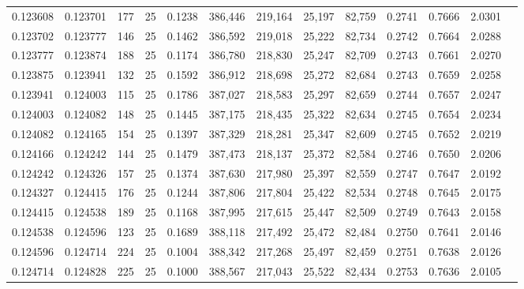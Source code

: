 \begin{tabular}{rrrrrrrrrrrrr}
0.123608 & 0.123701 &   177 &  25 &                                     0.1238 & 386,446 & 219,164 &  25,197 &  82,759 & 0.2741 & 0.7666 & 2.0301 \\
0.123702 & 0.123777 &   146 &  25 &                                     0.1462 & 386,592 & 219,018 &  25,222 &  82,734 & 0.2742 & 0.7664 & 2.0288 \\
0.123777 & 0.123874 &   188 &  25 &                                     0.1174 & 386,780 & 218,830 &  25,247 &  82,709 & 0.2743 & 0.7661 & 2.0270 \\
0.123875 & 0.123941 &   132 &  25 &                                     0.1592 & 386,912 & 218,698 &  25,272 &  82,684 & 0.2743 & 0.7659 & 2.0258 \\
0.123941 & 0.124003 &   115 &  25 &                                     0.1786 & 387,027 & 218,583 &  25,297 &  82,659 & 0.2744 & 0.7657 & 2.0247 \\
0.124003 & 0.124082 &   148 &  25 &                                     0.1445 & 387,175 & 218,435 &  25,322 &  82,634 & 0.2745 & 0.7654 & 2.0234 \\
0.124082 & 0.124165 &   154 &  25 &                                     0.1397 & 387,329 & 218,281 &  25,347 &  82,609 & 0.2745 & 0.7652 & 2.0219 \\
0.124166 & 0.124242 &   144 &  25 &                                     0.1479 & 387,473 & 218,137 &  25,372 &  82,584 & 0.2746 & 0.7650 & 2.0206 \\
0.124242 & 0.124326 &   157 &  25 &                                     0.1374 & 387,630 & 217,980 &  25,397 &  82,559 & 0.2747 & 0.7647 & 2.0192 \\
0.124327 & 0.124415 &   176 &  25 &                                     0.1244 & 387,806 & 217,804 &  25,422 &  82,534 & 0.2748 & 0.7645 & 2.0175 \\
0.124415 & 0.124538 &   189 &  25 &                                     0.1168 & 387,995 & 217,615 &  25,447 &  82,509 & 0.2749 & 0.7643 & 2.0158 \\
0.124538 & 0.124596 &   123 &  25 &                                     0.1689 & 388,118 & 217,492 &  25,472 &  82,484 & 0.2750 & 0.7641 & 2.0146 \\
0.124596 & 0.124714 &   224 &  25 &                                     0.1004 & 388,342 & 217,268 &  25,497 &  82,459 & 0.2751 & 0.7638 & 2.0126 \\
0.124714 & 0.124828 &   225 &  25 &                                     0.1000 & 388,567 & 217,043 &  25,522 &  82,434 & 0.2753 & 0.7636 & 2.0105 \\

\end{tabular}
